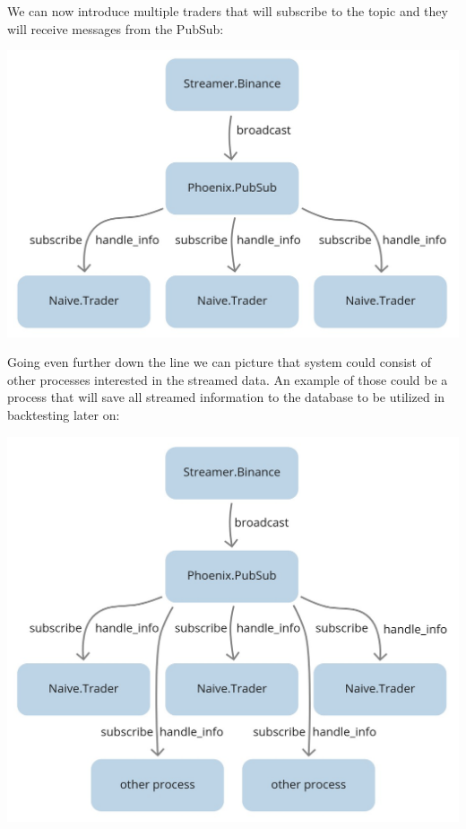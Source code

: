 \documentclass[
  oneside]{book}
\begin{document}
\newpage

We can now introduce multiple traders that will subscribe to the topic and they will receive messages from the PubSub:

\begin{center}\includegraphics[width=1\linewidth,height=0.35\textheight]{images/chapter_03_04_naive_trader_group} \end{center}

Going even further down the line we can picture that system could consist of other processes interested in the streamed data. An example of those could be a process that will save all streamed information to the database to be utilized in backtesting later on:

\begin{center}\includegraphics[width=1\linewidth,height=0.45\textheight]{images/chapter_03_05_other_services} \end{center}
\end{document}
